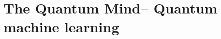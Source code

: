 %
%

\section{The Quantum Mind\texttrademark -- Quantum machine learning}\label{sec:quantum_mind}

\cite{bib:lloyd2013quantum}

